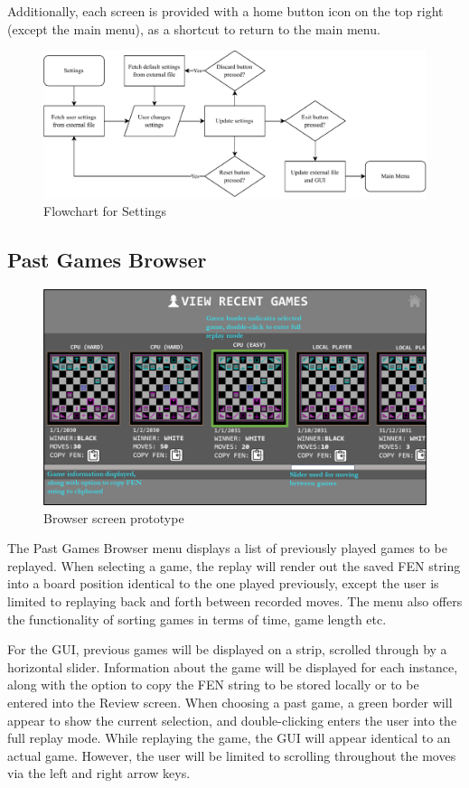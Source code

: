 \documentclass[../main/main.tex]{subfiles}
\begin{document}
Additionally, each screen is provided with a home button icon on the top right (except the main menu), as a shortcut to return to the main menu.

\begin{figure}[H]
    \centering
    \includegraphics[width=\columnwidth]{../design/assets/settings_flowchart.pdf}
    \caption{Flowchart for Settings}
    \label{fig:settings-flowchart}
\end{figure}

\subsection{Past Games Browser}
\begin{figure}[H]
    \centering
    \includegraphics[width=0.8\columnwidth]{../design/assets/browser_gui.png}
    \caption{Browser screen prototype}
    \label{fig:browser-gui}
\end{figure}

The Past Games Browser menu displays a list of previously played games to be replayed. When selecting a game, the replay will render out the saved FEN string into a board position identical to the one played previously, except the user is limited to replaying back and forth between recorded moves. The menu also offers the functionality of sorting games in terms of time, game length etc.

For the GUI, previous games will be displayed on a strip, scrolled through by a horizontal slider. Information about the game will be displayed for each instance, along with the option to copy the FEN string to be stored locally or to be entered into the Review screen. When choosing a past game, a green border will appear to show the current selection, and double-clicking enters the user into the full replay mode.
While replaying the game, the GUI will appear identical to an actual game. However, the user will be limited to scrolling throughout the moves via the left and right arrow keys.
\end{document}
